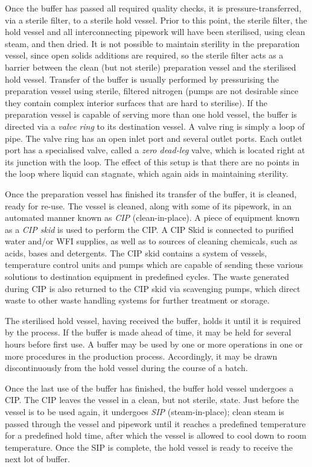 Once the buffer has passed all required quality checks, it is
pressure-transferred, via a sterile filter, to a sterile hold vessel.
Prior to this point, the sterile filter, the hold vessel and all
interconnecting pipework will have been sterilised, using clean steam, and then
dried.  
It is not possible to maintain sterility in the preparation vessel,
since open solids additions are required, so the sterile filter acts as a
barrier between the clean (but not sterile) preparation vessel and the
sterilised hold vessel.
Transfer of the buffer is usually performed by pressurising the preparation
vessel using sterile, filtered nitrogen (pumps are not desirable since they
contain complex interior surfaces that are hard to sterilise).
If the preparation vessel is capable of serving more than one hold vessel, the
buffer is directed via a \emph{valve ring} to its destination vessel.
A valve ring is simply a loop of pipe.
The valve ring has an open inlet port and several outlet ports.
Each outlet port has a specialised valve, called a \emph{zero dead-leg} valve,
which is located right at its junction with the loop.
The effect of this setup is that there are no points in the loop where liquid
can stagnate, which again aids in maintaining sterility.

Once the preparation vessel has finished its transfer of the buffer, it is
cleaned, ready for re-use.
The vessel is cleaned, along with some of its pipework, in an automated manner
known as \emph{CIP} (clean-in-place).
A piece of equipment known as a \emph{CIP skid} is used to perform the CIP.
A CIP Skid is connected to purified water and/or WFI supplies, as well as
to sources of cleaning chemicals, such as acids, bases and detergents.
The CIP skid contains a system of vessels, temperature control units and pumps
which are capable of sending these various solutions to destination equipment
in predefined cycles.  The waste generated during CIP is also returned to the
CIP skid via scavenging pumps, which direct waste to other waste handling
systems for further treatment or storage.

The sterilised hold vessel, having received the buffer, holds it until it is
required by the process.
If the buffer is made ahead of time, it may be held for several hours before
first use.
A buffer may be used by one or more operations in one or more procedures in the
production process.
Accordingly, it may be drawn discontinuously from the hold vessel during the
course of a batch.

Once the last use of the buffer has finished, the buffer hold vessel undergoes
a CIP.
The CIP leaves the vessel in a clean, but not sterile, state.
Just before the vessel is to be used again, it undergoes \emph{SIP}
(steam-in-place); clean steam is passed through the vessel and pipework until
it reaches a predefined temperature for a predefined hold time, after which the
vessel is allowed to cool down to room temperature.
Once the SIP is complete, the hold vessel is ready to receive the next lot of
buffer.

